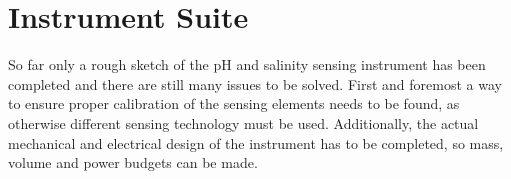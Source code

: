 \section{Instrument Suite}
So far only a rough sketch of the pH and salinity sensing instrument has been completed and there are still many issues to be solved. First and foremost a way to ensure proper calibration of the sensing elements needs to be found, as otherwise different sensing technology must be used. Additionally, the actual mechanical and electrical design of the instrument has to be completed, so mass, volume and power budgets can be made.